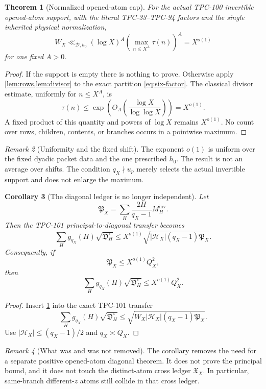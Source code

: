 \documentclass[11pt]{article}
\newtheorem{theorem}{Theorem}[section]
\newtheorem{corollary}[theorem]{Corollary}
\theoremstyle{definition}
\theoremstyle{remark}
\newtheorem{remark}[theorem]{Remark}
\newcommand{\PX}{\mathfrak P_X}
\newcommand{\XX}{\mathfrak X_X}
\newcommand{\HX}{\mathcal H_X}
\begin{document}
\begin{theorem}[Normalized opened-atom cap]
\label{thm:cap}
For the actual TPC-100 invertible opened-atom support, with the
literal TPC-33--TPC-94 factors and the single inherited physical
normalization,
\begin{equation}
 \boxed{
 W_X
 \ll_{\mathscr D,h_0}
 (\log X)^A
 \left(\max_{n\le X^A}\tau(n)\right)^A
 =X^{o(1)}}
\label{eq:cap}
\end{equation}
for one fixed \(A>0\).
\end{theorem}

\begin{proof}
If the support is empty there is nothing to prove.  Otherwise apply
\cref{lem:rows,lem:divisor} to the exact partition
\eqref{eq:six-factor}.  The classical divisor estimate, uniformly
for \(n\le X^A\), is
\[
 \tau(n)
 \le
 \exp\!\left(O_A\!\left(\frac{\log X}{\log\log X}\right)\right)
 =X^{o(1)}.
\]
A fixed product of this quantity and powers of \(\log X\) remains
\(X^{o(1)}\).  No count over rows, children, contents, or branches
occurs in a pointwise maximum.
\end{proof}

\begin{remark}[Uniformity and the fixed shift]
The exponent \(o(1)\) is uniform over the fixed dyadic packet data
and the one prescribed \(h_0\).  The result is not an average over
shifts.  The condition \(q_X\nmid u_p\) merely selects the actual
invertible support and does not enlarge the maximum.
\end{remark}

\begin{corollary}[The diagonal ledger is no longer independent]
\label{cor:diagonal}
Let
\[
 \PX=
 \sum_H\frac{2H}{q_X-1}M_H^{\mathrm{inv}}.
\]
Then the TPC-101 principal-to-diagonal transfer becomes
\[
 \sum_Hg_{q_X}(H)\sqrt{\mathfrak D_H^\circ}
 \le
 X^{o(1)}
 \sqrt{|\HX|(q_X-1)\PX}.
\]
Consequently, if
\[
 \PX\le X^{o(1)}Q_X^2,
\]
then
\[
 \sum_Hg_{q_X}(H)\sqrt{\mathfrak D_H^\circ}
 \le X^{o(1)}Q_X^2.
\]
\end{corollary}

\begin{proof}
Insert \cref{thm:cap} into the exact TPC-101 transfer
\[
 \sum_Hg_{q_X}(H)\sqrt{\mathfrak D_H^\circ}
 \le
 \sqrt{W_X|\HX|(q_X-1)\PX}.
\]
Use \(|\HX|\le(q_X-1)/2\) and \(q_X\asymp Q_X\).
\end{proof}

\begin{remark}[What was and was not removed]
The corollary removes the need for a separate positive
opened-atom diagonal theorem.  It does not prove the principal
bound, and it does not touch the distinct-atom cross ledger
\(\XX\).  In particular, same-branch different-\(z\) atoms still
collide in that cross ledger.
\end{remark}
\end{document}
